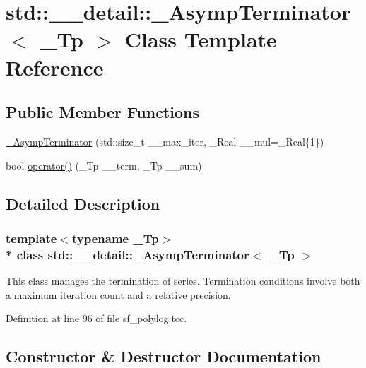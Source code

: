 \hypertarget{classstd_1_1____detail_1_1__AsympTerminator}{}\section{std\+:\+:\+\_\+\+\_\+detail\+:\+:\+\_\+\+Asymp\+Terminator$<$ \+\_\+\+Tp $>$ Class Template Reference}
\label{classstd_1_1____detail_1_1__AsympTerminator}
\subsection*{Public Member Functions}
\begin{DoxyCompactItemize}
\item 
\hyperlink{classstd_1_1____detail_1_1__AsympTerminator_a2a052a2ebedaa33cae3a6c07d73ca9cf}{\+\_\+\+Asymp\+Terminator} (std\+::size\+\_\+t \+\_\+\+\_\+max\+\_\+iter, \+\_\+\+Real \+\_\+\+\_\+mul=\+\_\+\+Real\{1\})
\item 
bool \hyperlink{classstd_1_1____detail_1_1__AsympTerminator_ad57254b6dcdd419b785477711b296729}{operator()} (\+\_\+\+Tp \+\_\+\+\_\+term, \+\_\+\+Tp \+\_\+\+\_\+sum)
\end{DoxyCompactItemize}


\subsection{Detailed Description}
\subsubsection*{template$<$typename \+\_\+\+Tp$>$\\*
class std\+::\+\_\+\+\_\+detail\+::\+\_\+\+Asymp\+Terminator$<$ \+\_\+\+Tp $>$}

This class manages the termination of series. Termination conditions involve both a maximum iteration count and a relative precision. 

Definition at line 96 of file sf\+\_\+polylog.\+tcc.



\subsection{Constructor \& Destructor Documentation}
